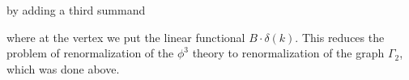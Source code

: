 \documentclass[11pt]{article}
\begin{document}
\noindent
by adding a third summand

\hfill

\begin{center} 

 
\end{center}

\hfill

where at the vertex we put the linear functional $B\cdot \delta(k)$. 
This reduces the problem of renormalization of the $\phi^3$ theory 
to renormalization of the graph $\Gamma_2$, which was done above. 
\end{document}
